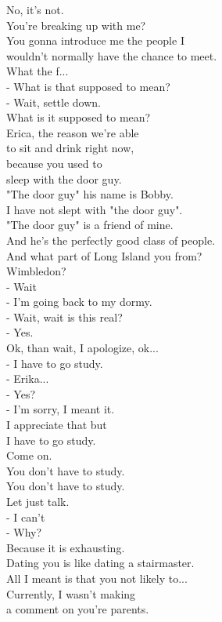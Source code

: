 \documentclass{article}
\begin{document}
\begin{multicols}{3}
No, it's not.\\
You're breaking up with me?\\
You gonna introduce me the people I\\
wouldn't normally have the chance to meet.\\
What the f...\\
- What is that supposed to mean?\\
- Wait, settle down.\\
What is it supposed to mean?\\
Erica, the reason we're able\\
to sit and drink right now,\\
because you used to\\
sleep with the door guy.\\
"The door guy" his name is Bobby.\\
I have not slept with "the door guy".\\
"The door guy" is a friend of mine.\\
And he's the perfectly good class of people.\\
And what part of Long Island you from?\\
Wimbledon?\\
- Wait\\
- I'm going back to my dormy.\\
- Wait, wait is this real?\\
- Yes.\\
Ok, than wait, I apologize, ok...\\
- I have to go study.\\
- Erika...\\
- Yes?\\
- I'm sorry, I meant it.\\
I appreciate that but\\
I have to go study.\\
Come on.\\
You don't have to study.\\
You don't have to study.\\
Let just talk.\\
- I can't\\
- Why?\\
Because it is exhausting.\\
Dating you is like dating a stairmaster.\\
All I meant is that you not likely to...\\
Currently, I wasn't making\\
a comment on you're parents.\\

\end{multicols}
\end{document}
